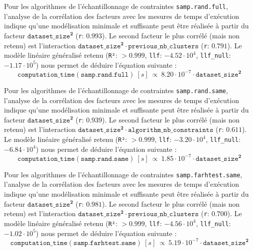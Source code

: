 			Pour les algorithmes de l'échantillonnage de contraintes \texttt{samp.rand.full}, l'analyse de la corrélation des facteurs avec les mesures de temps d'exécution indique qu'une modélisation minimale et suffisante peut être réalisée à partir du facteur $\texttt{dataset\_size}^{\textbf{2}}$ (\texttt{r}: $0.993$).
			Le second facteur le plus corrélé (mais non retenu) est l'interaction $\texttt{dataset\_size}^{\textbf{2}} \cdot \texttt{previous\_nb\_clusters}$ (\texttt{r}: $0.791$).
			Le modèle linéaire généralisé retenu (\texttt{R²}: $> 0.999$, \texttt{llf}: $-4.52 \cdot 10^{4}$, \texttt{llf\_null}: $-1.17 \cdot 10^{5}$) nous permet de déduire l'équation suivante :
			\begin{equation}
				\texttt{computation\_time}(\texttt{samp.rand.full})~[s]~
				\propto~8.20 \cdot 10^{-7} \cdot \texttt{dataset\_size}^{\textbf{2}}
			\end{equation}
			
			Pour les algorithmes de l'échantillonnage de contraintes \texttt{samp.rand.same}, l'analyse de la corrélation des facteurs avec les mesures de temps d'exécution indique qu'une modélisation minimale et suffisante peut être réalisée à partir du facteur $\texttt{dataset\_size}^{\textbf{2}}$ (\texttt{r}: $0.939$).
			Le second facteur le plus corrélé (mais non retenu) est l'interaction $\texttt{dataset\_size}^{\textbf{2}} \cdot \texttt{algorithm\_nb\_constraints}$ (\texttt{r}: $0.611$).
			Le modèle linéaire généralisé retenu (\texttt{R²}: $> 0.999$, \texttt{llf}: $-3.20 \cdot 10^{4}$, \texttt{llf\_null}: $-6.84 \cdot 10^{4}$) nous permet de déduire l'équation suivante :
			\begin{equation}
				\texttt{computation\_time}(\texttt{samp.rand.same})~[s]~
				\propto~1.85 \cdot 10^{-7} \cdot \texttt{dataset\_size}^{\textbf{2}}
			\end{equation}
			
			Pour les algorithmes de l'échantillonnage de contraintes \texttt{samp.farhtest.same}, l'analyse de la corrélation des facteurs avec les mesures de temps d'exécution indique qu'une modélisation minimale et suffisante peut être réalisée à partir du facteur $\texttt{dataset\_size}^{\textbf{2}}$ (\texttt{r}: $0.981$).
			Le second facteur le plus corrélé (mais non retenu) est l'interaction $\texttt{dataset\_size}^{\textbf{2}} \cdot \texttt{previous\_nb\_clusters}$ (\texttt{r}: $0.700$).
			Le modèle linéaire généralisé retenu (\texttt{R²}: $> 0.999$, \texttt{llf}: $-4.56 \cdot 10^{4}$, \texttt{llf\_null}: $-1.02 \cdot 10^{5}$) nous permet de déduire l'équation suivante :
			\begin{equation}
				\texttt{computation\_time}(\texttt{samp.farhtest.same})~[s]~
				\propto~5.19 \cdot 10^{-7} \cdot \texttt{dataset\_size}^{\textbf{2}}
			\end{equation}
			
